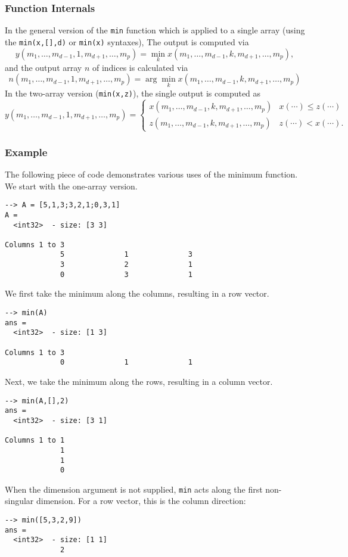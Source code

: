 \subsubsection{Function Internals}
In the general version of the \verb|min| function which is applied to
a single array (using the \verb|min(x,[],d)| or \verb|min(x)| syntaxes),
The output is computed via
\[
y(m_1,\ldots,m_{d-1},1,m_{d+1},\ldots,m_{p}) = 
\min_{k} x(m_1,\ldots,m_{d-1},k,m_{d+1},\ldots,m_{p}),
\]
and the output array $n$ of indices is calculated via
\[
n(m_1,\ldots,m_{d-1},1,m_{d+1},\ldots,m_{p}) = \arg
\min_{k} x(m_1,\ldots,m_{d-1},k,m_{d+1},\ldots,m_{p})
\]
In the two-array version (\verb|min(x,z)|), the single output is computed as
\[
  y(m_1,\ldots,m_{d-1},1,m_{d+1},\ldots,m_{p}) = 
\begin{cases}
  x(m_1,\ldots,m_{d-1},k,m_{d+1},\ldots,m_{p}) & x(\cdots) \leq z(\cdots) \\
  z(m_1,\ldots,m_{d-1},k,m_{d+1},\ldots,m_{p}) & z(\cdots) < x(\cdots).
\end{cases}
\]

\subsubsection{Example}
The following piece of code demonstrates various uses of the minimum
function.  We start with the one-array version.
\begin{verbatim}
--> A = [5,1,3;3,2,1;0,3,1]
A =
  <int32>  - size: [3 3]
  
Columns 1 to 3
             5              1              3
             3              2              1
             0              3              1
\end{verbatim}
We first take the minimum along the columns, resulting in a row vector.
\begin{verbatim}
--> min(A)
ans =
  <int32>  - size: [1 3]
  
Columns 1 to 3
             0              1              1
\end{verbatim}
Next, we take the minimum along the rows, resulting in a column vector.
\begin{verbatim}
--> min(A,[],2)
ans =
  <int32>  - size: [3 1]
  
Columns 1 to 1
             1
             1
             0
\end{verbatim}
When the dimension argument is not supplied, \verb|min| acts along the first non-singular dimension.  For a row vector, this is the column direction:
\begin{verbatim}
--> min([5,3,2,9])
ans =
  <int32>  - size: [1 1]
             2
\end{verbatim}

